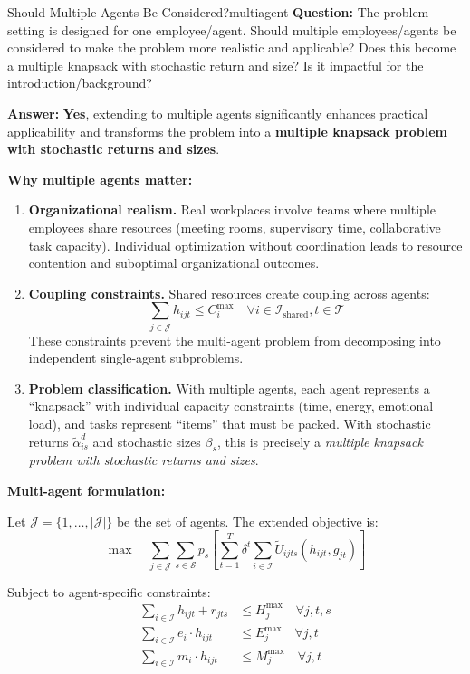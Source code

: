 \documentclass[11pt,a4paper]{article}
\begin{document}
\begin{questionbox}{Should Multiple Agents Be Considered?}{multiagent}
\textbf{Question:} The problem setting is designed for one employee/agent. Should multiple employees/agents be considered to make the problem more realistic and applicable? Does this become a multiple knapsack with stochastic return and size? Is it impactful for the introduction/background?

\textbf{Answer:} \textbf{Yes}, extending to multiple agents significantly enhances practical applicability and transforms the problem into a \textbf{multiple knapsack problem with stochastic returns and sizes}.

\textbf{Why multiple agents matter:}

\begin{enumerate}
    \item \textbf{Organizational realism.} Real workplaces involve teams where multiple employees share resources (meeting rooms, supervisory time, collaborative task capacity). Individual optimization without coordination leads to resource contention and suboptimal organizational outcomes.
    
    \item \textbf{Coupling constraints.} Shared resources create coupling across agents:
    $$\sum_{j \in \mathcal{J}} h_{ijt} \leq C_i^{\max} \quad \forall i \in \mathcal{I}_{\text{shared}}, t \in \mathcal{T}$$
    These constraints prevent the multi-agent problem from decomposing into independent single-agent subproblems.
    
    \item \textbf{Problem classification.} With multiple agents, each agent represents a ``knapsack'' with individual capacity constraints (time, energy, emotional load), and tasks represent ``items'' that must be packed. With stochastic returns $\tilde{\alpha}_{is}^d$ and stochastic sizes $\beta_s$, this is precisely a \textit{multiple knapsack problem with stochastic returns and sizes}.
\end{enumerate}

\textbf{Multi-agent formulation:}

Let $\mathcal{J} = \{1, \ldots, |\mathcal{J}|\}$ be the set of agents. The extended objective is:
$$\max \quad \sum_{j \in \mathcal{J}} \sum_{s \in \mathcal{S}} p_s \left[ \sum_{t=1}^T \delta^t \sum_{i \in \mathcal{I}} \tilde{U}_{ijts}(h_{ijt}, g_{jt}) \right]$$

Subject to agent-specific constraints:
\begin{align}
\sum_{i \in \mathcal{I}} h_{ijt} + r_{jts} &\leq H_j^{\max} \quad \forall j, t, s \\
\sum_{i \in \mathcal{I}} e_i \cdot h_{ijt} &\leq E_j^{\max} \quad \forall j, t \\
\sum_{i \in \mathcal{I}} m_i \cdot h_{ijt} &\leq M_j^{\max} \quad \forall j, t
\end{align}


\end{questionbox}
\end{document}
